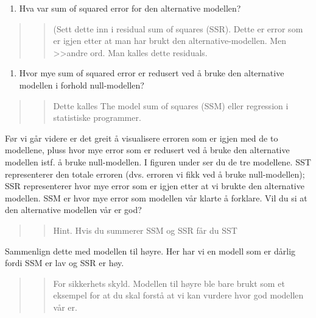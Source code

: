 \documentclass[
]{book}
\providecommand{\tightlist}{%
  \setlength{\itemsep}{0pt}\setlength{\parskip}{0pt}}
\begin{document}
\begin{enumerate}
\def\labelenumi{\alph{enumi}.}
\setcounter{enumi}{1}
\tightlist
\item
  Hva var sum of squared error for den alternative modellen?
\end{enumerate}

\begin{quote}
\begin{quote}
(Sett dette inn i residual sum of squares (SSR). Dette er error som er igjen etter at man har brukt den alternative-modellen. Men \textgreater\textgreater andre ord. Man kalles dette residuals.
\end{quote}
\end{quote}

\begin{enumerate}
\def\labelenumi{\alph{enumi}.}
\setcounter{enumi}{2}
\tightlist
\item
  Hvor mye sum of squared error er redusert ved å bruke den alternative modellen i forhold null-modellen?
\end{enumerate}

\begin{quote}
\begin{quote}
Dette kalles The model sum of squares (SSM) eller regression i statistiske programmer.
\end{quote}
\end{quote}

Før vi går videre er det greit å visualisere erroren som er igjen med de to modellene, pluss hvor mye error som er redusert ved å bruke den alternative modellen istf. å bruke null-modellen. I figuren under ser du de tre modellene. SST representerer den totale erroren (dvs. erroren vi fikk ved å bruke null-modellen); SSR representerer hvor mye error som er igjen etter at vi brukte den alternative modellen. SSM er hvor mye error som modellen vår klarte å forklare. Vil du si at den alternative modellen vår er god?

\begin{quote}
\begin{quote}
Hint. Hvis du summerer SSM og SSR får du SST
\end{quote}
\end{quote}

Sammenlign dette med modellen til høyre. Her har vi en modell som er dårlig fordi SSM er lav og SSR er høy.

\begin{quote}
\begin{quote}
For sikkerhets skyld. Modellen til høyre ble bare brukt som et eksempel for at du skal forstå at vi kan vurdere hvor god modellen vår er.
\end{quote}
\end{quote}
\end{document}

